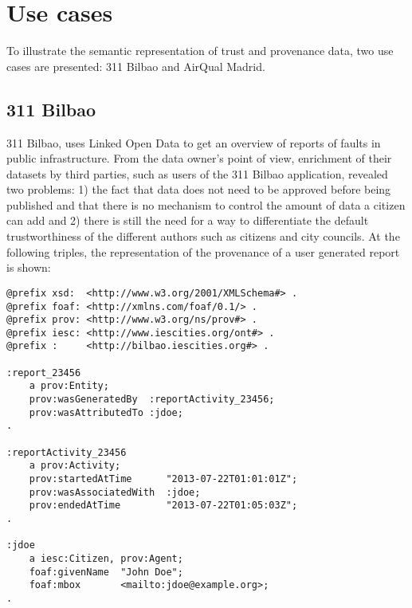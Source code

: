 \section{Use cases}
\label{sec:use_cases}

To illustrate the semantic representation of trust and provenance data, two use cases are presented: 311 Bilbao and AirQual Madrid.

\subsection{311 Bilbao}
\label{subsec:311}

311 Bilbao, uses Linked Open Data to get an overview of reports of faults in public infrastructure. From the data owner’s point of view, enrichment of their datasets by third parties, such as users of the 311 Bilbao application, revealed two problems: 1) the fact that data does not need to be approved before being published and that there is no mechanism to control the amount of data a citizen can add and 2) there is still the need for a way to differentiate the default trustworthiness of the different authors such as citizens and city councils. At the following triples, the representation of the provenance of a user generated report is shown:

\begin{verbatim}
@prefix xsd:  <http://www.w3.org/2001/XMLSchema#> .
@prefix foaf: <http://xmlns.com/foaf/0.1/> .
@prefix prov: <http://www.w3.org/ns/prov#> .
@prefix iesc: <http://www.iescities.org/ont#> .
@prefix :     <http://bilbao.iescities.org#> .

:report_23456
    a prov:Entity;
    prov:wasGeneratedBy  :reportActivity_23456;
    prov:wasAttributedTo :jdoe;
.

:reportActivity_23456
    a prov:Activity;
    prov:startedAtTime      "2013-07-22T01:01:01Z";
    prov:wasAssociatedWith  :jdoe;
    prov:endedAtTime        "2013-07-22T01:05:03Z";
.

:jdoe
    a iesc:Citizen, prov:Agent;
    foaf:givenName  "John Doe";
    foaf:mbox       <mailto:jdoe@example.org>;
.
\end{verbatim}
